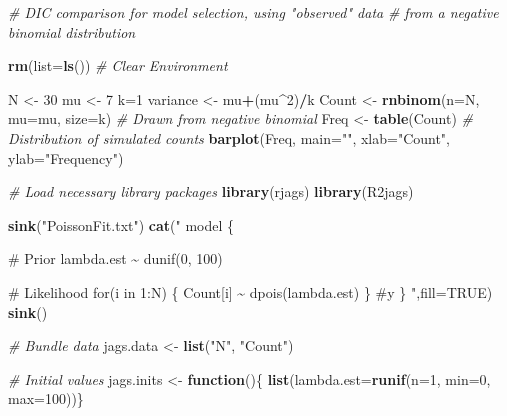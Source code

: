 \documentclass[
]{krantz}
\makeatletter
\newenvironment{Shaded}{\begin{snugshade}}{\end{snugshade}}
\newcommand{\AttributeTok}[1]{\textcolor[rgb]{0.27,0.27,0.27}{#1}}
\newcommand{\CommentTok}[1]{\textcolor[rgb]{0.37,0.37,0.37}{\textit{#1}}}
\newcommand{\ConstantTok}[1]{\textcolor[rgb]{0.37,0.37,0.37}{#1}}
\newcommand{\ControlFlowTok}[1]{\textcolor[rgb]{0.27,0.27,0.27}{\textbf{#1}}}
\newcommand{\DecValTok}[1]{\textcolor[rgb]{0.06,0.06,0.06}{#1}}
\newcommand{\FunctionTok}[1]{\textcolor[rgb]{0.27,0.27,0.27}{\textbf{#1}}}
\newcommand{\NormalTok}[1]{#1}
\newcommand{\OtherTok}[1]{\textcolor[rgb]{0.37,0.37,0.37}{#1}}
\newcommand{\SpecialCharTok}[1]{\textcolor[rgb]{0.43,0.43,0.43}{\textbf{#1}}}
\newcommand{\StringTok}[1]{\textcolor[rgb]{0.5,0.5,0.5}{#1}}
\newenvironment{kframe}{%
\medskip{}
\setlength{\fboxsep}{.8em}
 \def\at@end@of@kframe{}%
 \ifinner\ifhmode%
  \def\at@end@of@kframe{\end{minipage}}%
  \begin{minipage}{\columnwidth}%
 \fi\fi%
 \def\FrameCommand##1{\hskip\@totalleftmargin \hskip-\fboxsep
 \colorbox{shadecolor}{##1}\hskip-\fboxsep
     \hskip-\linewidth \hskip-\@totalleftmargin \hskip\columnwidth}%
 \MakeFramed {\advance\hsize-\width
   \@totalleftmargin\z@ \linewidth\hsize
   \@setminipage}}%
 {\par\unskip\endMakeFramed%
 \at@end@of@kframe}
\renewenvironment{Shaded}{\begin{kframe}}{\end{kframe}}
\makeatother
\begin{document}
\begin{Shaded}
\begin{Highlighting}[]
\CommentTok{\# DIC comparison for model selection, using "observed" data}
\CommentTok{\# from a negative binomial distribution}

\FunctionTok{rm}\NormalTok{(}\AttributeTok{list=}\FunctionTok{ls}\NormalTok{()) }\CommentTok{\# Clear Environment}

\NormalTok{N }\OtherTok{\textless{}{-}} \DecValTok{30}
\NormalTok{mu }\OtherTok{\textless{}{-}} \DecValTok{7}
\NormalTok{k}\OtherTok{=}\DecValTok{1}
\NormalTok{variance }\OtherTok{\textless{}{-}}\NormalTok{ mu}\SpecialCharTok{+}\NormalTok{(mu}\SpecialCharTok{\^{}}\DecValTok{2}\NormalTok{)}\SpecialCharTok{/}\NormalTok{k}
\NormalTok{Count }\OtherTok{\textless{}{-}} \FunctionTok{rnbinom}\NormalTok{(}\AttributeTok{n=}\NormalTok{N, }\AttributeTok{mu=}\NormalTok{mu, }\AttributeTok{size=}\NormalTok{k) }\CommentTok{\# Drawn from negative binomial}
\NormalTok{Freq }\OtherTok{\textless{}{-}} \FunctionTok{table}\NormalTok{(Count)  }\CommentTok{\# Distribution of simulated counts}
\FunctionTok{barplot}\NormalTok{(Freq, }\AttributeTok{main=}\StringTok{""}\NormalTok{, }\AttributeTok{xlab=}\StringTok{"Count"}\NormalTok{, }\AttributeTok{ylab=}\StringTok{"Frequency"}\NormalTok{)}

\CommentTok{\# Load necessary library packages}
\FunctionTok{library}\NormalTok{(rjags)}
\FunctionTok{library}\NormalTok{(R2jags)}

\FunctionTok{sink}\NormalTok{(}\StringTok{"PoissonFit.txt"}\NormalTok{)}
\FunctionTok{cat}\NormalTok{(}\StringTok{"}
\StringTok{model \{}

\StringTok{\# Prior}
\StringTok{ lambda.est \textasciitilde{} dunif(0, 100)}

\StringTok{\# Likelihood}
\StringTok{    for(i in 1:N) \{}
\StringTok{      Count[i] \textasciitilde{} dpois(lambda.est)}
\StringTok{      \} \#y}
\StringTok{\}}
\StringTok{    "}\NormalTok{,}\AttributeTok{fill=}\ConstantTok{TRUE}\NormalTok{)}
\FunctionTok{sink}\NormalTok{()}

\CommentTok{\# Bundle data}
\NormalTok{jags.data }\OtherTok{\textless{}{-}} \FunctionTok{list}\NormalTok{(}\StringTok{"N"}\NormalTok{, }\StringTok{"Count"}\NormalTok{)}

\CommentTok{\# Initial values}
\NormalTok{jags.inits }\OtherTok{\textless{}{-}} \ControlFlowTok{function}\NormalTok{()\{ }\FunctionTok{list}\NormalTok{(}\AttributeTok{lambda.est=}\FunctionTok{runif}\NormalTok{(}\AttributeTok{n=}\DecValTok{1}\NormalTok{, }\AttributeTok{min=}\DecValTok{0}\NormalTok{, }\AttributeTok{max=}\DecValTok{100}\NormalTok{))\}}


\end{Highlighting}
\end{Shaded}
\end{document}
